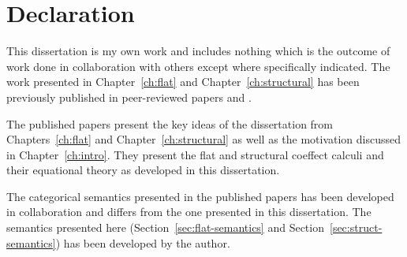 
\begingroup
\let\clearpage\relax
\let\cleardoublepage\relax
\let\cleardoublepage\relax

\chapter*{Declaration} %

This dissertation is my own work and includes nothing which is the outcome of work done in 
collaboration with others except where specifically indicated.
The work presented in Chapter~\ref{ch:flat} and Chapter~\ref{ch:structural} has been previously published
in peer-reviewed papers \cite{coeffects-icalp13} and \cite{coeffects-icfp14}. 

The published papers present the key ideas of the dissertation from Chapters~\ref{ch:flat} and 
Chapter~\ref{ch:structural} as well as the motivation discussed in Chapter~\ref{ch:intro}.
They present the flat and structural coeffect calculi and their equational theory as 
developed in this dissertation.

The categorical semantics presented in the published papers has been developed in collaboration and
differs from the one presented in this dissertation. The semantics 
presented here (Section~\ref{sec:flat-semantics} and Section~\ref{sec:struct-semantics}) 
has been developed by the author.

\endgroup			

\vfill